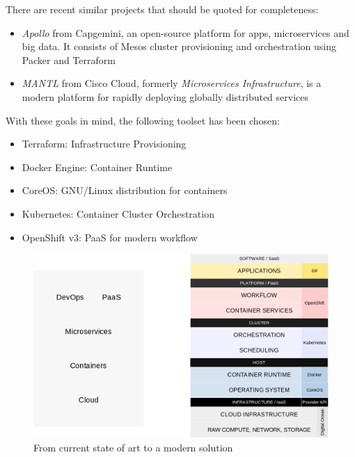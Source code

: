 There are recent similar projects that should be quoted for
completeness:

\begin{itemize}
\itemsep1pt\parskip0pt
\item
  \emph{Apollo}\cite{Apollo} from Capgemini, an open-source platform for
  apps, microservices and big data. It consists of Mesos cluster
  provisioning and orchestration using Packer and Terraform
\item
  \emph{MANTL}\cite{MANTL} from Cisco Cloud, formerly
  \emph{Microservices Infrastructure}, is a modern platform for rapidly
  deploying globally distributed services
\end{itemize}

With these goals in mind, the following toolset has been chosen:

\begin{itemize}
\itemsep1pt\parskip0pt
\item
  Terraform: Infrastructure Provisioning
\item
  Docker Engine: Container Runtime
\item
  CoreOS: GNU/Linux distribution for containers
\item
  Kubernetes: Container Cluster Orchestration
\item
  OpenShift v3: PaaS for modern workflow
\end{itemize}

\begin{figure}[htbp]
\centering
\includegraphics{media/ch2-solution.png}
\caption{From current state of art to a modern solution}
\end{figure}